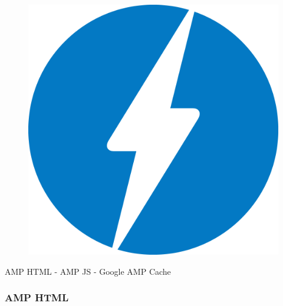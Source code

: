 \documentclass[graphic, aspectratio=169]{beamer}
\begin{document}

\begin{frame}
    \begin{figure}[h!]
    \centering
    \includegraphics[scale=0.1]{images/logo-AMP.png}
    \label{fig:AMP logo}
    \end{figure}
    \begin{center}
    AMP HTML   -   AMP JS  -  Google AMP Cache
    \end{center}
\end{frame}

\begin{frame}
    
\frametitle{AMP HTML}

\end{frame}
\end{document}
